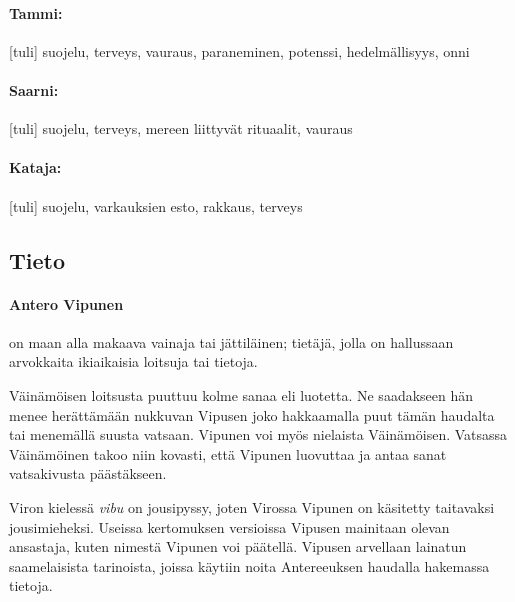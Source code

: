   \paragraph{Tammi:} [tuli] suojelu, terveys, vauraus, paraneminen, potenssi, hedelmällisyys, onni
  \paragraph{Saarni:} [tuli] suojelu, terveys, mereen liittyvät rituaalit, vauraus
  \paragraph{Kataja:} [tuli] suojelu, varkauksien esto, rakkaus, terveys


\subsection{Tieto}

  \paragraph{Antero Vipunen} on maan alla makaava vainaja tai jättiläinen; tietäjä, jolla on
    hallussaan arvokkaita ikiaikaisia loitsuja tai tietoja. \par
    Väinämöisen loitsusta puuttuu kolme sanaa eli luotetta. Ne saadakseen hän menee herättämään
    nukkuvan Vipusen joko hakkaamalla puut tämän haudalta tai menemällä suusta vatsaan. Vipunen
    voi myös nielaista Väinämöisen. Vatsassa Väinämöinen takoo niin kovasti, että Vipunen
    luovuttaa ja antaa sanat vatsakivusta päästäkseen. \par
    Viron kielessä \emph{vibu} on jousipyssy, joten Virossa Vipunen on käsitetty taitavaksi
    jousimieheksi. Useissa kertomuksen versioissa Vipusen mainitaan olevan ansastaja, kuten
    nimestä Vipunen voi päätellä. Vipusen arvellaan lainatun saamelaisista tarinoista, joissa
    käytiin noita Antereeuksen haudalla hakemassa tietoja.
